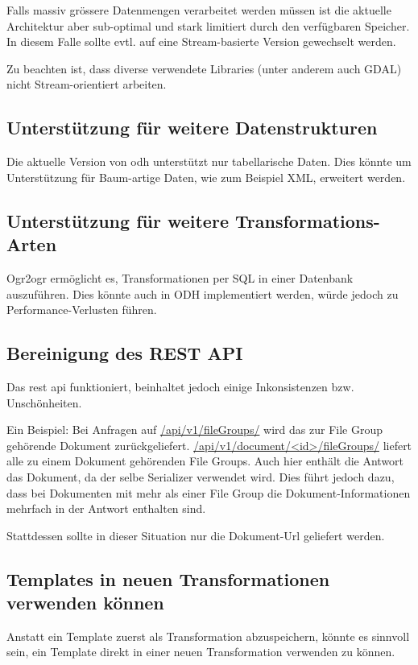 Falls massiv grössere Datenmengen verarbeitet werden müssen ist die aktuelle Architektur aber sub-optimal und stark limitiert durch den verfügbaren Speicher. In diesem Falle sollte evtl. auf eine Stream-basierte Version gewechselt werden.

Zu beachten ist, dass diverse verwendete Libraries (unter anderem auch GDAL) nicht Stream-orientiert arbeiten.

\subsection{Unterstützung für weitere Datenstrukturen}
Die aktuelle Version von \acs{odh} unterstützt nur tabellarische Daten. Dies könnte um Unterstützung für Baum-artige Daten, wie zum Beispiel XML, erweitert werden. 

\subsection{Unterstützung für weitere Transformations-Arten}
Ogr2ogr ermöglicht es, Transformationen per SQL in einer Datenbank auszuführen. Dies könnte auch in ODH implementiert werden, würde jedoch zu Performance-Verlusten führen.

\subsection{Bereinigung des REST API}
Das \gls{rest} \acs{api} funktioniert, beinhaltet jedoch einige Inkonsistenzen bzw. Unschönheiten. 

Ein Beispiel:
Bei Anfragen auf \url{/api/v1/fileGroups/} wird das zur File Group gehörende Dokument zurückgeliefert.
\url{/api/v1/document/<id>/fileGroups/} liefert alle zu einem Dokument gehörenden File Groups. Auch hier enthält die Antwort das Dokument, da der selbe Serializer verwendet wird. Dies führt jedoch dazu, dass bei Dokumenten mit mehr als einer File Group die Dokument-Informationen mehrfach in der Antwort enthalten sind.

Stattdessen sollte in dieser Situation nur die Dokument-Url geliefert werden.

\subsection{Templates in neuen Transformationen verwenden können}
Anstatt ein Template zuerst als Transformation abzuspeichern, könnte es sinnvoll sein, ein Template direkt in einer neuen Transformation verwenden zu können.

